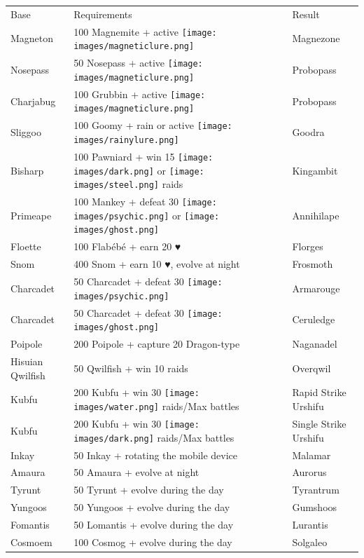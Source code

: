 \begin{table}
\footnotesize
\centering
\begin{tabular}{lll}
  Base & Requirements & Result \\
  \Midrule
  Magneton & 100 Magnemite + active \texttt{[image: images/magneticlure.png]} & Magnezone\\
  Nosepass & 50 Nosepass + active \texttt{[image: images/magneticlure.png]} & Probopass\\
  Charjabug & 100 Grubbin + active \texttt{[image: images/magneticlure.png]} & Probopass\\
  Sliggoo	& 100 Goomy + rain or active \texttt{[image: images/rainylure.png]}& Goodra\\
  Bisharp	& 100 Pawniard + win 15 \texttt{[image: images/dark.png]} or \texttt{[image: images/steel.png]} raids & Kingambit\\
  Primeape & 100 Mankey + defeat 30 \texttt{[image: images/psychic.png]} or \texttt{[image: images/ghost.png]} & Annihilape\\
  Floette	& 100 Flabébé + earn 20 ♥ & Florges\\
  Snom & 400 Snom + earn 10 ♥, evolve at night & Frosmoth \\
  Charcadet	& 50 Charcadet + defeat 30 \texttt{[image: images/psychic.png]}& Armarouge\\
  Charcadet	& 50 Charcadet + defeat 30 \texttt{[image: images/ghost.png]}& Ceruledge\\
  Poipole & 200 Poipole + capture 20 Dragon-type & Naganadel\\
  Hisuian Qwilfish & 50 Qwilfish + win 10 raids & Overqwil\\
  Kubfu	& 200 Kubfu + win 30 \texttt{[image: images/water.png]} raids/Max battles & Rapid Strike Urshifu\\
  Kubfu	& 200 Kubfu + win 30 \texttt{[image: images/dark.png]} raids/Max battles & Single Strike Urshifu\\
  Inkay	& 50 Inkay + rotating the mobile device & Malamar\\
  Amaura & 50 Amaura + evolve at night & Aurorus\\
  Tyrunt & 50 Tyrunt + evolve during the day & Tyrantrum\\
  Yungoos & 50 Yungoos + evolve during the day & Gumshoos\\
  Fomantis & 50 Lomantis + evolve during the day & Lurantis\\
  Cosmoem & 100 Cosmog + evolve during the day & Solgaleo\\

\end{tabular}
\end{table}
